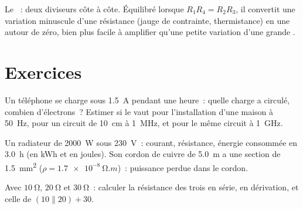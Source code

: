 \begin{omfigure}

{\small Le ~: deux diviseurs côte à côte. Équilibré
lorsque $R_1R_4 = R_2R_3$, il convertit une variation minuscule d'une
résistance (jauge de contrainte, thermistance) en une  autour de
zéro, bien plus facile à amplifier qu'une petite variation d'une grande
.}
\end{omfigure}

\section{Exercices}

\begin{exercise}[$\star$]\label{exo:b1:dc-circuits:1}
Un téléphone se charge sous \qty{1.5}{A} pendant une heure~: quelle
charge a circulé, combien d'électrons~? Estimer si le  vaut pour l'installation d'une maison à \qty{50}{Hz}, pour
un circuit de \qty{10}{cm} à \qty{1}{MHz}, et pour le même circuit à
\qty{1}{GHz}.
\end{exercise}

\begin{exercise}[$\star$]\label{exo:b1:dc-circuits:2}
Un radiateur de \qty{2000}{W} sous \qty{230}{V}~: courant, résistance,
énergie consommée en \qty{3.0}{h} (en kWh et en joules). Son cordon de
cuivre de \qty{5.0}{m} a une section de \qty{1.5}{mm^2} ($\rho = \qty{1.7e-8}{\ohm.m}$)~:
puissance perdue dans le cordon.
\end{exercise}

\begin{exercise}[$\star$]\label{exo:b1:dc-circuits:3}
Avec $\qty{10}{\ohm}$, $\qty{20}{\ohm}$ et $\qty{30}{\ohm}$~: calculer
la résistance des trois en série, en dérivation, et celle de
$(10 \parallel 20) + 30$.
\end{exercise}

